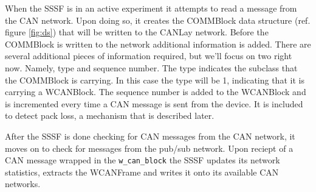 \documentclass[letterpaper,twocolumn,12pt]{article}
\begin{document}
When the SSSF is in an active experiment it attempts to read a message from the CAN network. Upon doing so, it creates the COMMBlock data structure (ref. figure \ref{fig:ds}) that will be written to the CANLay network. 
Before the COMMBlock is written to the network additional information is added. There are several additional pieces of information required, but we'll focus on two right now. Namely, type and sequence number.
The type indicates the subclass that the COMMBlock is carrying. In this case the type will be 1, indicating that it is carrying a WCANBlock. 
The sequence number is added to the WCANBlock and is incremented every time a CAN message is sent from the device. 
It is included to detect pack loss, a mechanism that is described later. 

After the SSSF is done checking for CAN messages from the CAN network, it moves on to check for messages from the pub/sub network.
Upon reciept of a CAN message wrapped in the \texttt{w\_can\_block} the SSSF updates its network statistics, extracts the WCANFrame and writes it onto its available CAN networks.
\end{document}
